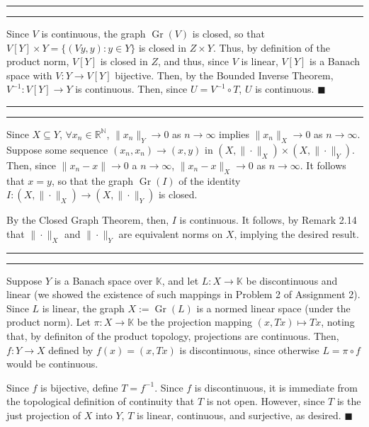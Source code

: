 \documentclass[11pt]{article}
\newcounter{questionCounter}
\newcounter{partCounter}[questionCounter]
\newenvironment{question}[2][\arabic{questionCounter}]{%
    \setcounter{partCounter}{0}%
    \vspace{.25in} \hrule \vspace{0.5em}%
        \noindent{\bf #2}%
    \vspace{0.8em} \hrule \vspace{.10in}%
    \addtocounter{questionCounter}{1}%
}{}
\renewcommand{\qed}{\quad $\blacksquare$}
\newcommand{\inv}{^{-1}}
\newcommand{\Gr}{\operatorname{Gr}} %
\newcommand{\N}{\mathbb{N}} %
\newcommand{\R}{\mathbb{R}} %
\newcommand{\K}{\mathbb{K}} %
\begin{document}
\begin{question}{Problem 7}
Since $V$ is continuous, the graph $\Gr(V)$ is closed, so that
$V[Y] \times Y = \{(Vy,y) : y \in Y\}$ is closed in $Z \times Y$. Thus, by
definition of the product norm, $V[Y]$ is closed in $Z$, and thus, since $V$ is
linear, $V[Y]$ is a Banach space with $V : Y \rightarrow V[Y]$ bijective. Then,
by the Bounded Inverse Theorem, $V\inv : V[Y] \rightarrow Y$ is continuous.
Then, since $U = V\inv \circ T$, $U$ is continuous. \qed
\end{question}

\newpage
\begin{question}{Problem 8}
Since $X \subseteq Y$, $\forall x_n \in \R^{\N}$, $\|x_n\|_Y \rightarrow 0$ as
$n \rightarrow \infty$ implies $\|x_n\|_X \rightarrow 0$ as $n \rightarrow
\infty$. Suppose some sequence $(x_n,x_n) \rightarrow (x,y)$ in $(X,
\|\cdot\|_X) \times (X, \|\cdot\|_Y)$. Then, since $\|x_n - x\| \rightarrow 0$
a $n \rightarrow \infty$, $\|x_n - x\|_X \rightarrow 0$ as $n \rightarrow
\infty$. It follows that $x = y$, so that the graph $\Gr(I)$ of the identity
$I : (X,\|\cdot\|_X) \rightarrow (X,\|\cdot\|_Y)$ is closed.

By the Closed Graph Theorem, then, $I$ is continuous. It follows, by Remark
2.14 that $\|\cdot\|_X$ and $\|\cdot\|_Y$ are equivalent norms on $X$, implying
the desired result.
\end{question}

\begin{question}{Problem 9}
Suppose $Y$ is a Banach space over $\K$, and let
$L : X \rightarrow \K$ be discontinuous and linear (we showed the
existence of such mappings in Problem 2 of Assignment 2). Since $L$ is linear,
the graph $X := \Gr(L)$ is a normed linear space (under the product norm). Let
$\pi : X \rightarrow \K$ be the projection mapping $(x,Tx) \mapsto Tx$, noting
that, by definiton of the product topology, projections are continuous. Then,
$f : Y \rightarrow X$ defined by $f(x) = (x,Tx)$ is discontinuous, since
otherwise $L = \pi \circ f$ would be continuous.

Since $f$ is bijective, define $T = f\inv$. Since $f$ is discontinuous, it is
immediate from the topological definition of continuity that $T$ is not open.
However, since $T$ is the just projection of $X$ into $Y$, $T$ is linear,
continuous, and surjective, as desired. \qed
\end{question}
\end{document}
